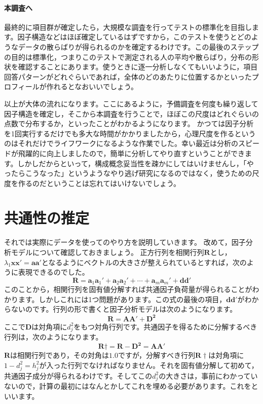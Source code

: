 \documentclass{ltjsbook}
\begin{document}
\paragraph{本調査へ}最終的に項目群が確定したら，大規模な調査を行ってテストの標準化を目指します。因子構造などはほぼ確定しているはずですから，このテストを使うとどのようなデータの散らばりが得られるのかを確定するわけです。この最後のステップの目的は標準化，つまりこのテストで測定される人の平均や散らばり，分布の形状を確認することにあります。使うときに逐一分析しなくてもいいように，項目回答パターンがどれぐらいであれば，全体のどのあたりに位置するかといったプロフィールが作れるとなおいいでしょう。

以上が大体の流れになります。ここにあるように，予備調査を何度も繰り返して因子構造を確定し，そこから本調査を行うことで，ほぼこの尺度はどれぐらいの点数で分布するか，といったことがわかるようになります。
かつては因子分析を1回実行するだけでも多大な時間がかかりましたから，心理尺度を作るというのはそれだけでライフワークになるような作業でした。幸い最近は分析のスピードが飛躍的に向上しましたので，簡単に分析してやり直すということができます。しかしだからといって，構成概念妥当性を疎かにしてはいけませんし，「やったらこうなった」というようなやり逃げ研究になるのではなく，使うための尺度を作るのだということは忘れてはいけないでしょう。

\section{共通性の推定}

それでは実際にデータを使ってのやり方を説明していきます。
改めて，因子分析モデルについて確認しておきましょう。
正方行列を相関行列$\bm{R}$とし，$\lambda_1 \bm{xx'} = \bm{aa'}$となるようにベクトルの大きさが整えられているとすれば，次のように表現できるのでした。
\begin{equation}
\bm{R}=\bm{a}_1\bm{a}_1'+\bm{a}_2\bm{a}_2'+\cdots +\bm{a}_m\bm{a}_m'+\bm{d} \bm{d}'
\end{equation}
このことから，相関行列を固有値分解すれば共通因子負荷量が得られることがわかります。しかしこれには1つ問題があります。この式の最後の項目，$\bm{d} \bm{d}'$がわからないのです。行列の形で書くと因子分析モデルは次のようになります。
\[
\bm{R} = \bm{AA'}+\bm{D^2}
\]
ここで$\bm{D}$は対角項に$d_j^2$をもつ対角行列です。共通因子を得るために分解するべき行列は，次のようになります。
\[
\bm{R}\dagger = \bm{R}-\bm{D^2} = \bm{AA'}
\]
$\bm{R}$は相関行列であり，その対角は$1.0$ですが，分解すべき行列$\bm{R}\dagger$は対角項に$1-d_j^2=h_j^2$が入った行列でなければなりません。それを固有値分解して初めて，共通因子成分が得られるわけです。そしてこの$d_j^2$の大きさは，事前にわかっていないので，計算の最初にはなんとかしてこれを埋める必要があります。これをといいます。
\end{document}
